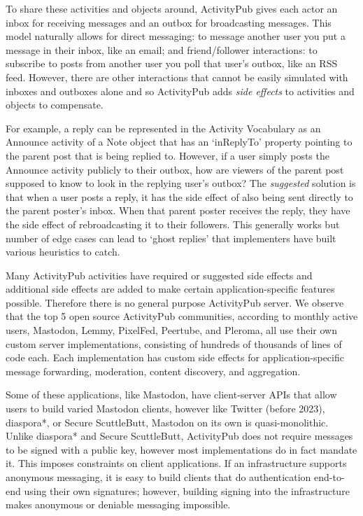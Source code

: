 To share these activities and objects around, ActivityPub gives each actor an inbox for receiving messages and an outbox for broadcasting messages.
This model naturally allows for direct messaging: to message another user you put a message in their inbox, like an email; and friend/follower interactions: to subscribe to posts from another user you poll that user's outbox, like an RSS feed.
However, there are other interactions that cannot be easily simulated with inboxes and outboxes alone and so ActivityPub adds \emph{side effects} to activities and objects to compensate.

For example, a reply can be represented in the Activity Vocabulary as an Announce activity of a Note object that has an `inReplyTo' property pointing to the parent post that is being replied to.
However, if a user simply posts the Announce activity publicly to their outbox, how are viewers of the parent post supposed to know to look in the replying user's outbox?
The \emph{suggested} solution is that when a user posts a reply, it has the side effect of also being sent directly to the parent poster's inbox. When that parent poster receives the reply, they have the side effect of rebroadcasting it to their followers.
This generally works but number of edge cases can lead to `ghost replies' that implementers have built various heuristics to catch.

Many ActivityPub activities have required or suggested side effects and additional side effects are added to make certain application-specific features possible.
Therefore there is no general purpose ActivityPub server.
We observe that the top 5 open source ActivityPub communities, according to monthly active users, Mastodon, Lemmy, PixelFed, Peertube, and Pleroma, all use their own custom server implementations, consisting of hundreds of thousands of lines of code each. Each implementation has custom side effects for application-specific message forwarding, moderation, content discovery, and aggregation.

Some of these applications, like Mastodon, have client-server APIs that allow users to build varied Mastodon clients, however like Twitter (before 2023), diaspora*, or Secure ScuttleButt, Mastodon on its own is quasi-monolithic.
Unlike diaspora* and Secure ScuttleButt, ActivityPub does not require messages to be signed with a public key, however most implementations do in fact mandate it.  This imposes constraints on client applications.   If an infrastructure supports anonymous messaging, it is easy to build clients that do authentication end-to-end using their own signatures; however, building signing into the infrastructure makes anonymous or deniable messaging impossible.

